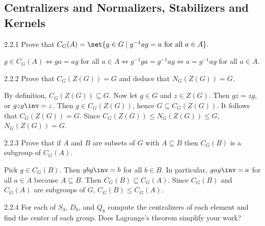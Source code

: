 \subsection{Centralizers and Normalizers, Stabilizers and Kernels}

\begin{exercise}{2.2.1}
    Prove that $C_G(A)=\set{g\in G\mid g^{-1}ag=a\text{ for all }a\in A}.$
\end{exercise}

\begin{sol}
    $g \in C_G(A) \iff ga = ag$ for all $a \in A \iff g^{-1}ga = g^{-1}ag \iff a = g^{-1}ag$ for all $a \in A$.
\end{sol}

\begin{exercise}{2.2.2}
    Prove that $C_G(Z(G))=G$ and deduce that $N_G(Z(G))=G.$
\end{exercise}

\begin{sol}
    By definition, $C_G(Z(G)) \subseteq G$.
	Now let $g \in G$ and $z \in Z(G)$.
	Then $gz = zg$, or $gzg\inv = z$.
	Then $g \in C_G(Z(G))$, hence $G \subseteq C_G(Z(G))$.
	It follows that $C_G(Z(G)) = G$.
	Since $C_G(Z(G)) \leq N_G(Z(G)) \leq G$, $N_G(Z(G)) = G$.
\end{sol}

\begin{exercise}{2.2.3}
    Prove that if $A$ and $B$ are subsets of $G$ with $A \subseteq B$ then $C_G(B)$ is a subgroup of $C_G(A)$.
\end{exercise}

\begin{sol}
    Pick $g \in C_G(B)$.
	Then $gbg\inv = b$ for all $b \in B$.
	In particular, $gag\inv = a$ for all $a \in A$ because $A \subseteq B$.
	Then $C_G(B) \subseteq C_G(A)$.
	Since $C_G(B)$ and $C_G(A)$ are subgroups of $G$, $C_G(B) \leq C_G(A)$.
\end{sol}

\begin{spex}{2.2.4}
    For each of $S_3$, $D_8$, and $Q_8$ compute the centralizers of each element and find the center of each group.
	Does Lagrange's theorem simplify your work?
\end{spex}

